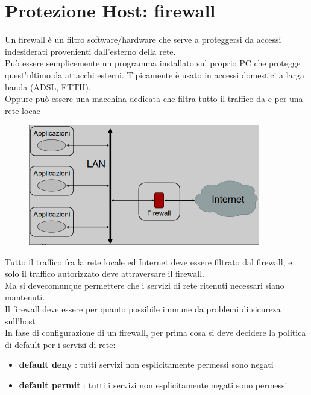 \documentclass{report}
\begin{document}
        \section{Protezione Host: firewall}
            Un firewall è un filtro software/hardware che serve a proteggersi da accessi indesiderati provenienti dall'esterno della rete.
           \\
            Può essere semplicemente un programma installato sul proprio PC che protegge quest'ultimo da attacchi esterni. Tipicamente è usato in accessi domestici a larga banda (ADSL, FTTH).
            \\
            Oppure può essere una macchina dedicata che filtra tutto il traffico da e per una rete locae
            \begin{figure}[H]
                \includegraphics[width=0.9\textwidth]{2/fir2.png
                }
            \end{figure}
            Tutto il traffico fra la rete locale ed Internet deve essere filtrato dal firewall, e solo il traffico autorizzato deve attraversare il firewall.
            \\
            Ma si devecomunque permettere che i servizi di rete ritenuti necessari siano mantenuti.
            \\
            Il firewall deve essere per quanto possibile immune da problemi di sicureza sull'host
            \\
            In fase di configurazione di un firewall, per prima cosa si deve decidere la politica di default per i servizi di rete:
            \begin{itemize}
                \item \textbf{default deny} : tutti servizi non esplicitamente permessi sono negati
                \item \textbf{default permit} : tutti i servizi non esplicitamente negati sono permessi
            \end{itemize}
\end{document}
